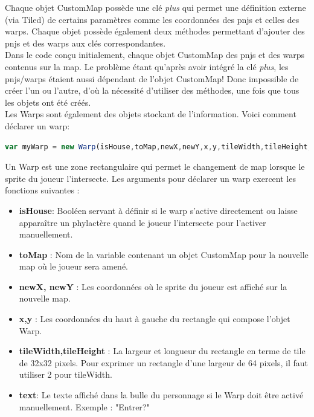 \documentclass[11pt]{article}
\begin{document}
\begin{appendices}
Chaque objet CustomMap possède une clé \textit{plus} qui permet une définition externe (via Tiled) de certains paramètres comme les coordonnées des pnjs et celles des warps. Chaque objet possède également deux méthodes permettant d'ajouter des pnjs et des warps aux clés correspondantes.\\

Dans le code conçu initialement, chaque objet CustomMap des pnjs et des warps contenus sur la map. Le problème étant qu'après avoir intégré la clé \textit{plus}, les pnjs/warps étaient aussi dépendant de l'objet CustomMap! Donc impossible de créer l'un ou l'autre, d'où la nécessité d'utiliser des méthodes, une fois que tous les objets ont été créés. \\ 


Les Warps sont également des objets stockant de l'information. Voici comment déclarer un warp: 

\begin{lstlisting}[language=JavaScript]
var myWarp = new Warp(isHouse,toMap,newX,newY,x,y,tileWidth,tileHeight,text);
\end{lstlisting} 
Un Warp est une zone rectangulaire qui permet le changement de map lorsque le sprite du joueur l'intersecte. Les arguments pour déclarer un warp exercent les fonctions suivantes : 
\begin{itemize}
\item \textbf{isHouse}: Booléen servant à définir si le warp s'active directement ou laisse apparaître un phylactère quand le joueur l'intersecte pour l'activer manuellement.
\item \textbf{toMap} : Nom de la variable contenant un objet CustomMap pour la nouvelle map où le joueur sera amené.
\item \textbf{newX, newY} : Les coordonnées où le sprite du joueur est affiché sur la nouvelle map.
\item \textbf{x,y} : Les coordonnées du haut à gauche du rectangle qui compose l'objet Warp.
\item \textbf{tileWidth,tileHeight} : La largeur et longueur du rectangle en terme de tile de 32x32 pixels. Pour exprimer un rectangle d'une largeur de 64 pixels, il faut utiliser 2 pour tileWidth.
\item \textbf{text}: Le texte affiché dans la bulle du personnage si le Warp doit être activé manuellement. Exemple : "Entrer?"
\end{itemize}

\end{appendices}
\end{document}
